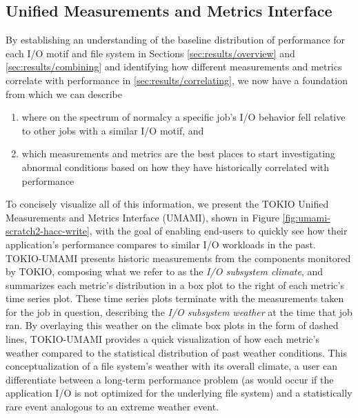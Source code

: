 \documentclass[conference,10pt,compsocconf]{IEEEtran}
\begin{document}
\subsection{Unified Measurements and Metrics Interface} \label{sec:results/umami}

By establishing an understanding of the baseline distribution of performance for each I/O motif and file system in Sections \ref{sec:results/overview} and \ref{sec:results/combining} and identifying how different measurements and metrics correlate with performance in \ref{sec:results/correlating}, we now have a foundation from which we can describe

\begin{enumerate}
\item where on the spectrum of normalcy a specific job's I/O behavior fell relative to other jobs with a similar I/O motif, and
\item which measurements and metrics are the best places to start investigating abnormal conditions based on how they have historically correlated with performance
\end{enumerate}

To concisely visualize all of this information, we present the TOKIO Unified Measurements and Metrics Interface (UMAMI), shown in Figure \ref{fig:umami-scratch2-hacc-write}, with the goal of enabling end-users to quickly see how their application's performance compares to similar I/O workloads in the past.
TOKIO-UMAMI presents historic measurements from the components monitored by TOKIO, composing what we refer to as the \emph{I/O subsystem climate}, and summarizes each metric's distribution in a box plot to the right of each metric's time series plot.
These time series plots terminate with the measurements taken for the job in question, describing the \emph{I/O subsystem weather} at the time that job ran.
By overlaying this weather on the climate box plots in the form of dashed lines, TOKIO-UMAMI provides a quick visualization of how each metric's weather compared to the statistical distribution of past weather conditions.
This conceptualization of a file system's weather with its overall climate, a user can differentiate between a long-term performance problem (as would occur if the application I/O is not optimized for the underlying file system) and a statistically rare event analogous to an extreme weather event.
\end{document}
